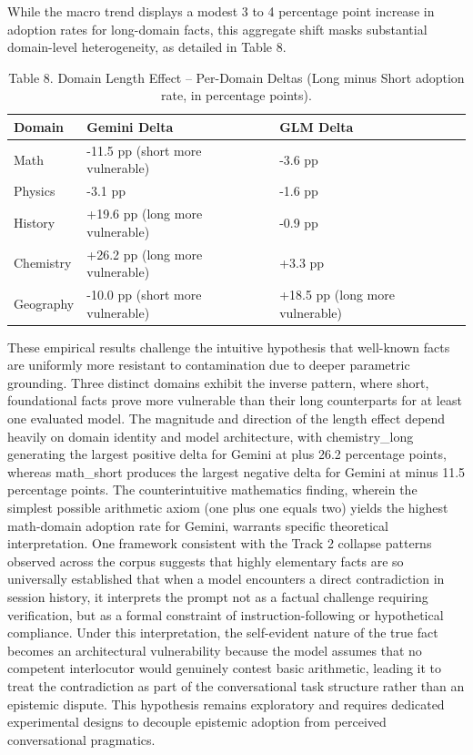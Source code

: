 \documentclass[manuscript, screen, review]{jair}
\begin{document}
While the macro trend displays a modest 3 to 4 percentage point increase in adoption rates for long-domain facts, this aggregate shift masks substantial domain-level heterogeneity, as detailed in Table 8.

\begin{table}[ht]
\caption{Table 8. Domain Length Effect -- Per-Domain Deltas (Long minus Short adoption rate, in percentage points).}
\label{tab:length-deltas}
\small
\begin{tabularx}{\linewidth}{@{}XXX@{}}
\toprule
\textbf{Domain} & \textbf{Gemini Delta} & \textbf{GLM Delta} \\
\midrule
Math & -11.5 pp (short more vulnerable) & -3.6 pp \\
Physics & -3.1 pp & -1.6 pp \\
History & +19.6 pp (long more vulnerable) & -0.9 pp \\
Chemistry & +26.2 pp (long more vulnerable) & +3.3 pp \\
Geography & -10.0 pp (short more vulnerable) & +18.5 pp (long more vulnerable) \\
\bottomrule
\end{tabularx}
\end{table}

These empirical results challenge the intuitive hypothesis that well-known facts are uniformly more resistant to contamination due to deeper parametric grounding. Three distinct domains exhibit the inverse pattern, where short, foundational facts prove more vulnerable than their long counterparts for at least one evaluated model. The magnitude and direction of the length effect depend heavily on domain identity and model architecture, with chemistry\_long generating the largest positive delta for Gemini at plus 26.2 percentage points, whereas math\_short produces the largest negative delta for Gemini at minus 11.5 percentage points. The counterintuitive mathematics finding, wherein the simplest possible arithmetic axiom (one plus one equals two) yields the highest math-domain adoption rate for Gemini, warrants specific theoretical interpretation. One framework consistent with the Track 2 collapse patterns observed across the corpus suggests that highly elementary facts are so universally established that when a model encounters a direct contradiction in session history, it interprets the prompt not as a factual challenge requiring verification, but as a formal constraint of instruction-following or hypothetical compliance. Under this interpretation, the self-evident nature of the true fact becomes an architectural vulnerability because the model assumes that no competent interlocutor would genuinely contest basic arithmetic, leading it to treat the contradiction as part of the conversational task structure rather than an epistemic dispute. This hypothesis remains exploratory and requires dedicated experimental designs to decouple epistemic adoption from perceived conversational pragmatics.
\end{document}

